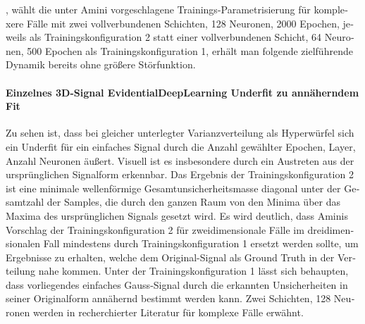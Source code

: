 \begin{otherlanguage}{ngerman}
, wählt die unter Amini vorgeschlagene Trainings-Parametrisierung für komplexere Fälle mit zwei vollverbundenen Schichten, 128 Neuronen, 2000 Epochen, jeweils als Trainingskonfiguration 2 statt einer vollverbundenen Schicht, 64 Neuronen, 500 Epochen als Trainingskonfiguration 1, erhält man folgende zielführende Dynamik bereits ohne größere Störfunktion. 



\paragraph{Einzelnes 3D-Signal \gls{EvidentialDeepLearning} Underfit zu annäherndem Fit} Zu sehen ist, dass bei gleicher unterlegter Varianzverteilung als Hyperwürfel sich ein Underfit für ein einfaches Signal durch die Anzahl gewählter Epochen, Layer, Anzahl Neuronen äußert. Visuell ist es insbesondere durch ein Austreten aus der ursprünglichen Signalform erkennbar. Das Ergebnis der Trainingskonfiguration 2 ist eine minimale wellenförmige Gesamtunsicherheitsmasse diagonal unter der Gesamtzahl der Samples, die durch den ganzen Raum von den Minima über das Maxima des ursprünglichen Signals gesetzt wird. Es wird deutlich, dass Aminis Vorschlag der Trainingskonfiguration 2 für zweidimensionale Fälle im dreidimensionalen Fall mindestens durch Trainingskonfiguration 1 ersetzt werden sollte, um Ergebnisse zu erhalten, welche dem Original-Signal als Ground Truth in der Verteilung nahe kommen. Unter der Trainingskonfiguration 1 lässt sich behaupten, dass vorliegendes einfaches Gauss-Signal durch die erkannten Unsicherheiten in seiner Originalform annähernd bestimmt werden kann. Zwei Schichten, 128 Neuronen werden in recherchierter Literatur für komplexe Fälle erwähnt. %



\end{otherlanguage}
